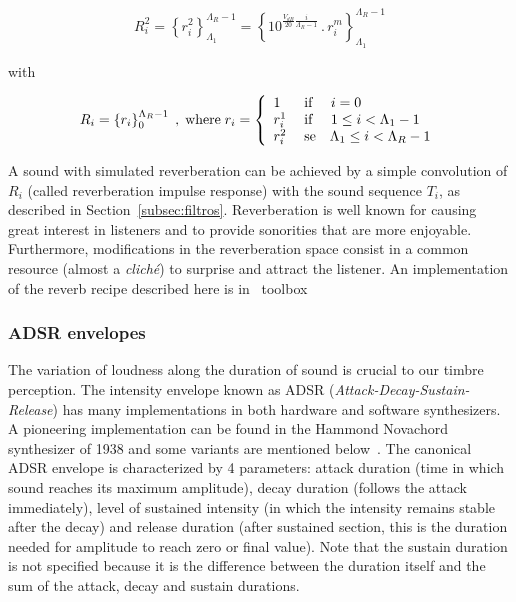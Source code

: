 \begin{equation}\label{eq:p2rev}
    R_i^2=\left\{r_i^2\right\}_{\Lambda_1}^{\Lambda_R-1}=\left\{10^{\frac{V_{dB}}{20}\frac{i}{\Lambda_R-1}}\,.\,r_i^m\right\}_{\Lambda_1}^{\Lambda_R-1}
\end{equation}

\noindent with

\begin{equation}\label{eq:rev}
	R_i=\left\{r_i\right\}_0^{\Lambda_R-1}\;,\; \text{where} \; r_i=\left\{
        \begin{array}{l l}
            1\; & \text{if }\quad i=0 \\
            r_i^1\;  & \text{if }\quad 1\leq i<\Lambda_1-1 \\
                                     r_i^2 \; & \text{se}\quad \Lambda_1 \leq i < \Lambda_R-1 \\
        \end{array} \right.
\end{equation}

A sound with simulated reverberation can be achieved by a simple convolution of $R_i$ (called reverberation impulse response) with the sound sequence $T_i$, as described in Section~\ref{subsec:filtros}. Reverberation is well known for causing great interest in listeners and to provide sonorities that are more enjoyable. Furthermore, modifications in the reverberation space consist in a common resource (almost a \textit{clich\'{e}}) to surprise and attract the listener. An implementation of the reverb recipe described here is in \massa\ toolbox~\cite{MASSA}

\subsubsection{ADSR envelopes}
The variation of loudness along the duration of sound is crucial to our timbre perception. The intensity envelope known as ADSR (\emph{Attack-Decay-Sustain-Release}) has many implementations in both hardware and software synthesizers. A pioneering implementation can be found in the Hammond Novachord synthesizer of 1938 and some variants are mentioned below~\cite{ADSR}. The canonical ADSR envelope is characterized by 4 parameters: attack duration (time in which sound reaches its maximum amplitude), decay duration (follows the attack immediately), level of sustained intensity (in which the intensity remains stable after the decay) and release duration (after sustained section, this is the duration needed for amplitude to reach zero or final value).
Note that the sustain duration is not specified because it is the difference between the duration itself and the sum of the attack, decay and sustain durations.

